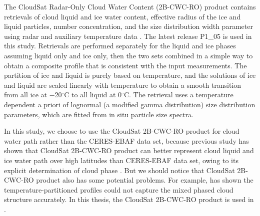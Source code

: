 The CloudSat Radar-Only Cloud Water Content (2B-CWC-RO) product contains retrievals of cloud liquid and ice water content, effective radius of the ice and liquid particles, number concentration, and the size distribution width parameter using radar and auxiliary temperature data \citep{Austin2009}. The latest release P1\_05 is used in this study. Retrievals are performed separately for the liquid and ice phases assuming liquid only and ice only, then the two sets combined in a simple way to obtain a composite proﬁle that is consistent with the input measurements. The partition of ice and liquid is purely based on temperature, and the solutions of ice and liquid are scaled linearly with temperature to obtain a smooth transition from all ice at −20$^\circ$C to all liquid at 0$^\circ$C. The retrieval uses a temperature dependent a priori of lognormal (a modified gamma distribution) size distribution parameters, which are fitted from in situ particle size spectra.  

In this study, we choose to use the CloudSat 2B-CWC-RO product for cloud water path rather than the CERES-EBAF data set, because previous study has shown that CloudSat 2B-CWC-RO product can better represent cloud liquid and ice water path over high latitudes than CERES-EBAF data set, owing to its explicit determination of cloud phase \citep{Lenaerts2017}. But we should notice that CloudSat 2B-CWC-RO product also has some potential problems. For example, \cite{Barker2008} has shown the temperature-partitioned profiles could not capture the mixed phased cloud structure accurately. In this thesis, the CloudSat 2B-CWC-RO product is used in .


